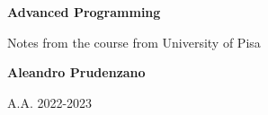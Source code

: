 \begin{titlepage}
    \begin{center}
        \vspace*{1cm}

        \huge
        \textbf{Advanced Programming}

        \vspace{0.5cm}

        Notes from the course from University of Pisa

        \vspace{1.5cm}

        \textbf{Aleandro Prudenzano}

        \vfill
        \vspace{0.8cm}

        A.A. 2022-2023

    \end{center}
\end{titlepage}

\clearpage
\begingroup
  \pagestyle{empty}
  \null
  \newpage
\endgroup

\renewcommand{\contentsname}{Index}
\tableofcontents

\clearpage
\begingroup
  \pagestyle{empty}
  \null
  \newpage
\endgroup